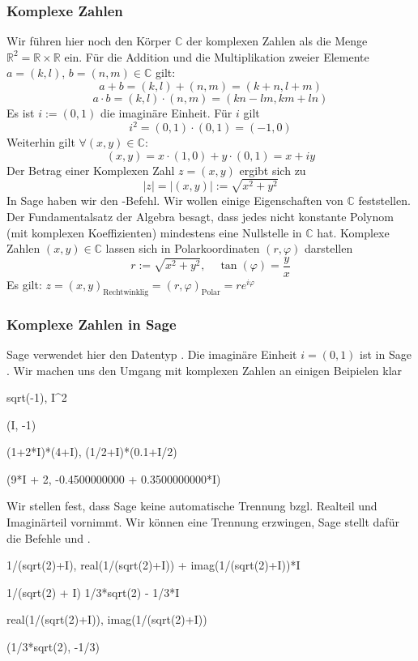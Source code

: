 \documentclass[fontsize=12pt,paper=a4,twoside,bibtotoc,idxtotoc,
liststotoc,pagesize,BCOR1.2cm,DIV15,chapterprefix,pagesize=pdftex]{scrbook}
\theoremstyle{plain}
\theoremstyle{definition}
\theoremstyle{remark}
\begin{document}
\subsubsection{Komplexe Zahlen}
Wir führen hier noch den Körper $\mathbb{C}$ der komplexen Zahlen als die Menge $\mathbb{R}^2=\mathbb{R} \times \mathbb{R}$ ein. 
Für die Addition und die Multiplikation zweier Elemente $a=(k,l)$, $b=(n,m)\in \mathbb{C}$ gilt: 
\[a+b=(k,l)+(n,m)=(k+n,l+m)\]
\[a\cdot b= (k,l) \cdot (n,m) = (kn-lm, km+ln) \]
Es ist $i:=(0,1)$ die imaginäre Einheit. Für $i$ gilt
\[ i^2=(0,1) \cdot (0,1) = (-1,0) \]
Weiterhin gilt  $\forall (x,y) \in \mathbb{C}:$
\[(x,y)=x \cdot (1,0) + y \cdot (0,1)= x +i y\]
Der Betrag einer Komplexen Zahl $z=(x,y)$ ergibt sich zu
\[|z|=|(x,y)|:=\sqrt{x^2+y^2}\]
In Sage haben wir den -Befehl. Wir wollen einige Eigenschaften von $\mathbb{C}$ feststellen.
Der Fundamentalsatz der Algebra besagt, dass jedes nicht konstante Polynom (mit komplexen Koeffizienten) mindestens eine Nullstelle in $\mathbb{C}$ hat. 
Komplexe Zahlen $(x,y) \in \mathbb{C}$ lassen sich in Polarkoordinaten $(r, \varphi)$ darstellen 
\[  r:= \sqrt{x^2+y^2}, \quad \tan(\varphi)=\frac{y}{x} \] 
Es gilt: $z = (x,y)_{\text{Rechtwinklig}} = (r,\varphi)_{\text{Polar}} = re^{i\varphi}$
\subsubsection{Komplexe Zahlen in Sage}
Sage verwendet hier den Datentyp .
 Die imaginäre Einheit $i=(0,1)$ ist in Sage .
Wir machen uns den Umgang mit komplexen Zahlen an einigen Beipielen klar
\begin{sagein}
sqrt(-1), I^2
\end{sagein}
\begin{sageout}
(I, -1)
\end{sageout}
\begin{sagein}
(1+2*I)*(4+I), (1/2+I)*(0.1+I/2)
\end{sagein}
\begin{sageout}
 (9*I + 2, -0.4500000000 + 0.3500000000*I)
\end{sageout}
Wir stellen fest, dass Sage keine automatische Trennung bzgl. Realteil und  Imaginärteil vornimmt. Wir können eine Trennung erzwingen, 
Sage stellt dafür die Befehle  und .
\begin{sagein}
1/(sqrt(2)+I), real(1/(sqrt(2)+I)) + imag(1/(sqrt(2)+I))*I
\end{sagein}
\begin{sageout}
1/(sqrt(2) + I)
1/3*sqrt(2) - 1/3*I
\end{sageout}
\begin{sagein}
real(1/(sqrt(2)+I)), imag(1/(sqrt(2)+I))
\end{sagein}
\begin{sageout}
(1/3*sqrt(2), -1/3)
\end{sageout}
\end{document}
